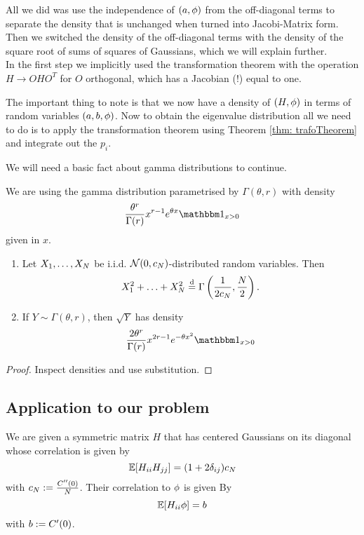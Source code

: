 All we did was use the independence of $(a,\phi)$ from the off-diagonal terms to separate the density that is unchanged when turned into Jacobi-Matrix form. Then we switched the density of the off-diagonal terms with the density of the square root of sums of squares of Gaussians, which we will explain further.\\
In the first step we implicitly used the transformation theorem with the operation $H \to OHO^T$ for $O$ orthogonal, which has a Jacobian (!) equal to one.

The important thing to note is that we now have a density of $(H,\phi)$ in terms of random variables $(a,b,\phi)$. Now to obtain the eigenvalue distribution all we need to do is to apply the transformation theorem using Theorem \ref{thm: trafoTheorem} and integrate out the $p_i$.

We will need a basic fact about gamma distributions to continue.

\begin{lemma}\label{lem: gammaFacts}
    We are using the gamma distribution parametrised by $\Gamma(\theta, r)$ with density
    $$ \frac{\theta^r}{\Gamma(r)} x^{r-1} e^{\theta x} \ind_{x>0}$$
    given in $x$.
    \begin{enumerate}
        \item Let $X_1, \ldots, X_N$ be i.i.d. $\mathcal{N}(0,c_N)$-distributed random        variables. Then 
            $$ X_1^2 + \ldots + X_N^2 \overset{\text{d}}{=} \Gamma\left(\frac{1}{2c_N}, \frac{N}{2}\right).$$

        \item If $Y \sim \Gamma(\theta, r)$, then $\sqrt{Y}$ has density
            $$ \frac{2\theta^r}{\Gamma(r)} x^{2r-1} e^{-\theta x^2} \ind_{x>0} $$
    \end{enumerate}
\end{lemma}
\begin{proof}
    Inspect densities and use substitution. 
\end{proof}



\subsection{Application to our problem}

We are given a symmetric matrix $H$ that has centered Gaussians on its diagonal whose correlation is given by 
$$  \mathbb{E}[H_{ii}H_{jj}] = (1+2\delta_{ij}) c_N$$
with $c_N := \frac{C''(0)}{N}$. Their correlation to $\phi$ is given By
$$ \mathbb{E}[H_{ii} \phi] = b $$
with $b := C'(0)$.

